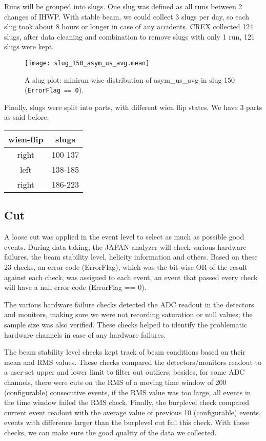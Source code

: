 Runs will be grouped into slugs. One slug was defined as all runs between 2
changes of IHWP. With stable beam, we could collect 3 slugs per day, so 
each slug took about 8 hours or longer in case of any accidents. CREX collected
124 slugs, after data cleaning and combination to remove slugs with only 1 run, 
121 slugs were kept.
\begin{figure}
    \centering
    \texttt{[image: slug\_150\_asym\_us\_avg.mean]}
    \caption{A slug plot: minirun-wise distribution of asym\_us\_avg in slug 150 
    (\texttt{ErrorFlag == 0}).}
\end{figure}

Finally, slugs were split into parts, with different wien flip states. We
have 3 parts as said before.
\begin{table}[!h]
    \centering
    \begin{tabular}{c | c}
	\hline
	wien-flip   & slugs \\
	\hline
	right	& 100-137   \\
	left	& 138-185   \\
	right	& 186-223   \\
	\hline
    \end{tabular}
\end{table}

\subsection{Cut}
A loose cut was applied in the event level to select as much as possible good events.
During data taking, the JAPAN analyzer will check various hardware failures, the
beam stability level, helicity information and others. Based on these 23 checks,
an error code (ErrorFlag), which was the bit-wise OR of the result against each
check, was assigned to each event, an event that passed every check will have
a null error code (ErrorFlag == 0). 

The various hardware failure checks detected the ADC readout in the detectors and
monitors, making sure we were not recording saturation or null values; the 
sample size was also verified. These checks helped to identify the problematic
hardware channels in case of any hardware failures.

The beam stability level checks kept track of beam conditions based on their
mean and RMS values. These checks compared the detectors/monitors readout to 
a user-set upper and lower limit to filter out outliers; besides, for some ADC 
channels, there were cuts on the RMS of a moving time window of 200 (configurable) %
consecutive events, 
if the RMS value was too large, all events in the time window failed the RMS check. 
Finally, the burplevel check compared current event readout with the average
value of previous 10 (configurable) events, events with difference larger than
the burplevel cut fail this check. With these checks, we can make sure the good 
quality of the data we collected.

